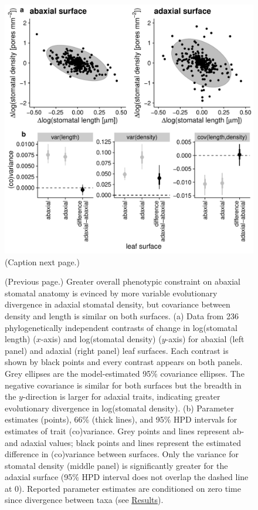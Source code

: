 \documentclass[
  12pt,
]{article}
\begin{document}
\begin{figure}[ht]
\includegraphics[width=\textwidth]{../figures/h1.pdf}
  \caption{(Caption next page.)}
  \label{fig:h1}
\end{figure}
\addtocounter{figure}{-1}

\begin{figure} [t!]
\caption{(Previous page.) Greater overall phenotypic constraint on abaxial stomatal anatomy is evinced by more variable evolutionary divergence in adaxial stomatal density, but covariance between density and length is similar on both surfaces. (a) Data from 236 phylogenetically independent contrasts of change in log(stomatal length) ($x$-axis) and log(stomatal density) ($y$-axis) for abaxial (left panel) and adaxial (right panel) leaf surfaces. Each contrast is shown by black points and every contrast appears on both panels. Grey ellipses are the model-estimated 95\% covariance ellipses. The negative covariance is similar for both surfaces but the breadth in the $y$-direction is larger for adaxial traits, indicating greater evolutionary divergence in log(stomatal density). (b) Parameter estimates (points), 66\% (thick lines), and 95\% HPD intervals for estimates of trait (co)variance. Grey points and lines represent ab- and adaxial values; black points and lines represent the estimated difference in (co)variance between surfaces. Only the variance for stomatal density (middle panel) is significantly greater for the adaxial surface (95\% HPD interval does not overlap the dashed line at 0). Reported parameter estimates are conditioned on zero time since divergence between taxa (see \protect\hyperlink{results}{Results}).}
\end{figure}
\end{document}
